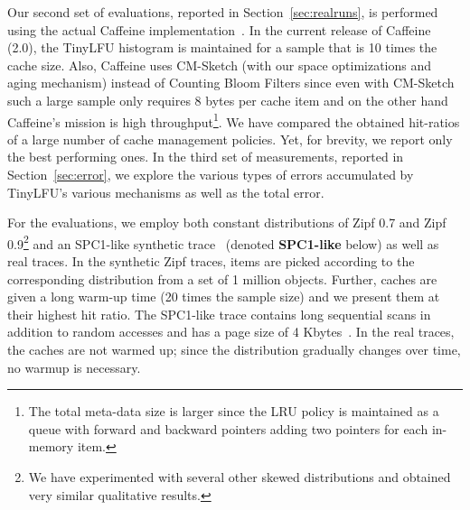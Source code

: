 \documentclass[10pt,a4paper]{article}
\begin{document}
Our second set of evaluations, reported in Section~\ref{sec:realruns}, is performed using the actual Caffeine implementation~\cite{CaffeineProject}.
In the current release of Caffeine (2.0), the TinyLFU histogram is maintained for a sample that is 10 times the cache size.
Also, Caffeine uses CM-Sketch (with our space optimizations and aging mechanism) instead of Counting Bloom Filters since even with CM-Sketch such a large sample only requires 8 bytes per cache item and on the other hand Caffeine's mission is high throughput\footnote{
The total meta-data size is larger since the LRU policy is maintained as a queue with forward and backward pointers adding two pointers for each in-memory item.}.
We have compared the obtained hit-ratios of a large number of cache management policies.
Yet, for brevity, we report only the best performing ones.
In the third set of measurements, reported in Section~\ref{sec:error}, we explore the various types of errors accumulated by TinyLFU's various mechanisms as well as the total error.

For the evaluations, we employ both constant distributions of Zipf 0.7 and Zipf 0.9\footnote{We have experimented with several other skewed distributions and obtained very similar qualitative results.}
and an SPC1-like synthetic trace~\cite{ARC} (denoted \textbf{SPC1-like} below) as well as real traces.
In the synthetic Zipf traces, items are picked according to the corresponding distribution from a set of 1 million objects.
Further, caches are given a long warm-up time (20 times the sample size) and we present them at their highest hit ratio.
The SPC1-like trace contains long sequential scans in addition to random accesses and has a page size of 4 Kbytes~\cite{ARC}.
In the real traces, the caches are not warmed up; since the distribution gradually changes over time, no warmup is necessary.
\end{document}
